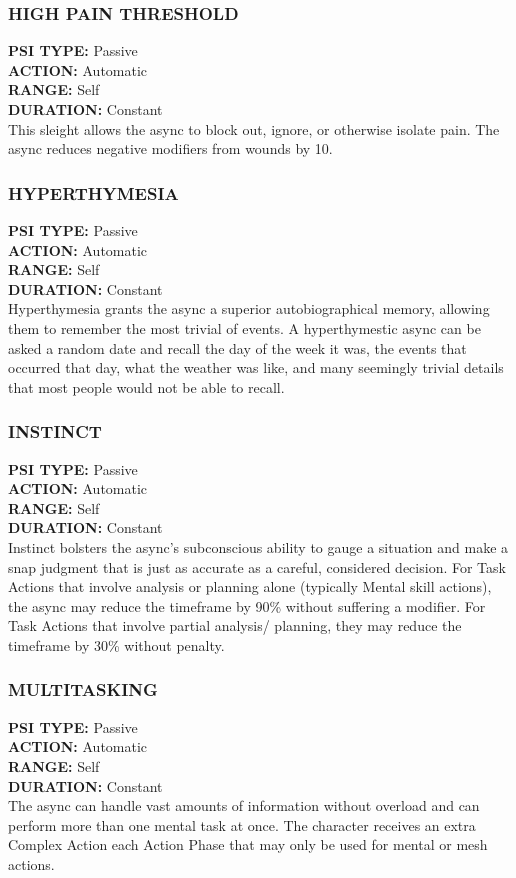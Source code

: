 \subsubsection{HIGH PAIN THRESHOLD} \textbf{PSI TYPE:} Passive \\ \textbf{ACTION:} Automatic \\ \textbf{RANGE:} Self \\ \textbf{DURATION:} Constant \\ This sleight allows the async to block out, ignore, or otherwise isolate pain. The async reduces negative modifiers from wounds by 10. 

\subsubsection{HYPERTHYMESIA} \textbf{PSI TYPE:} Passive \\ \textbf{ACTION:} Automatic \\ \textbf{RANGE:} Self \\ \textbf{DURATION:} Constant \\ Hyperthymesia grants the async a superior autobiographical memory, allowing them to remember the most trivial of events. A hyperthymestic async can be asked a random date and recall the day of the week it was, the events that occurred that day, what the weather was like, and many seemingly trivial details that most people would not be able to recall. 

\subsubsection{INSTINCT} \textbf{PSI TYPE:} Passive \\ \textbf{ACTION:} Automatic \\ \textbf{RANGE:} Self \\ \textbf{DURATION:} Constant \\ Instinct bolsters the async’s subconscious ability to gauge a situation and make a snap judgment that is just as accurate as a careful, considered decision. For Task Actions that involve analysis or planning alone (typically Mental skill actions), the async may reduce the timeframe by 90\% without suffering a modifier. For Task Actions that involve partial analysis/ planning, they may reduce the timeframe by 30\% without penalty. 

\subsubsection{MULTITASKING} \textbf{PSI TYPE:} Passive \\ \textbf{ACTION:} Automatic \\ \textbf{RANGE:} Self \\ \textbf{DURATION:} Constant \\ The async can handle vast amounts of information without overload and can perform more than one mental task at once. The character receives an extra Complex Action each Action Phase that may only be used for mental or mesh actions. 

